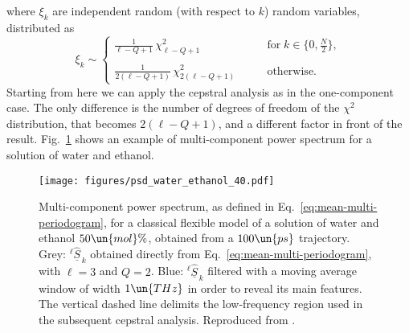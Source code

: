 where $\xi_k$ are independent random (with respect to $k$) random variables, distributed as
\begin{equation}
  \xi_k \sim
  \begin{cases}
    \frac{1}{\ell-Q+1} \,\chi^2_{\ell-Q+1}  \qquad & \mathrm{for} \; k \in \{0 , \frac{N}{2}\}, \\
 \\
 \frac{1}{2(\ell-Q+1)} \, \chi^2_{2(\ell-Q+1)} \qquad & \mathrm{otherwise}.
\end{cases}
\end{equation}
Starting from here we can apply the cepstral analysis as in the one-component case. The only difference is the number of degrees of freedom of the $\chi^2$ distribution, that becomes $2(\ell -Q+1)$, and a different factor in front of the result. Fig.~\ref{fig:grappa-periodogram} shows an example of multi-component power spectrum for a solution of water and ethanol.

\begin{figure}
\centering
\texttt{[image: figures/psd\_water\_ethanol\_40.pdf]}
\caption{Multi-component power spectrum, as defined in Eq.~\eqref{eq:mean-multi-periodogram}, for a classical flexible model of a solution of water and ethanol $50\un{mol}\%$, obtained from a $100\un{ps}$ trajectory. Grey: $^{\ell}\hat{\underline{S}}_{\,k}$ obtained directly from Eq.~\eqref{eq:mean-multi-periodogram}, with $\ell=3$ and $Q=2$. Blue: $^{\ell}\hat{\underline{S}}_{\,k}$ filtered with a moving average window of width $1\un{THz}$ in order to reveal its main features. The vertical dashed line delimits the low-frequency region used in the subsequent cepstral analysis. Reproduced from \cite{Bertossa2018}.}  \label{fig:grappa-periodogram}
\end{figure}

